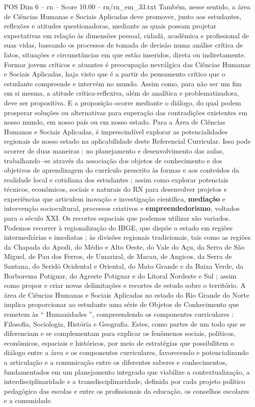 \begin{textsample}{POS Dim 6 – rn – Score 10.00 – rn/rn\_em\_33.txt}
Também, nesse sentido, a área de Ciências Humanas e Sociais Aplicadas deve promover, junto aos estudantes, reflexões e atitudes questionadoras, mediante as quais possam projetar expectativas em relação às dimensões pessoal, cidadã, acadêmica e profissional de suas vidas, baseando os processos de tomada de decisão numa análise crítica de fatos, situações e circunstâncias em que estão inseridos, direta ou indiretamente.
Formar jovens críticos e atuantes é preocupação nevrálgica das Ciências Humanas e Sociais Aplicadas, haja visto que é a partir do pensamento crítico que o estudante compreende e intervém no mundo.
Assim como, para não ser um fim em si mesma, a atitude crítica-reflexiva, além de analítica e problematizadora, deve ser propositiva.
E a proposição ocorre mediante o diálogo, do qual podem prosperar soluções ou alternativas para superação das contradições existentes em nosso mundo, em nosso país ou em nosso estado.
Para a Área de Ciências Humanas e Sociais Aplicadas, é imprescindível explorar as potencialidades regionais de nosso estado na aplicabilidade deste Referencial Curricular.
Isso pode ocorrer de duas maneiras : no planejamento e desenvolvimento das aulas, trabalhando -se através da associação dos objetos de conhecimento e dos objetivos de aprendizagem do currículo prescrito às formas e aos conteúdos da realidade local e cotidiana dos estudantes ; assim como explorar potenciais técnicos, econômicos, sociais e naturais do RN para desenvolver projetos e experiências que articulem inovação e investigação científica, \textbf{mediação} e intervenção sociocultural, processos criativos e \textbf{empreendedorismo}, voltados para o século XXI.
Os recortes espaciais que podemos utilizar são variados.
Podemos recorrer à regionalização do IBGE, que dispõe o estado em regiões intermediárias e imediatas ; às divisões regionais tradicionais, tais como as regiões da Chapada do Apodi, do Médio e Alto Oeste, do Vale do Açu, da Serra de São Miguel, de Pau dos Ferros, de Umarizal, de Macau, de Angicos, da Serra de Santana, do Seridó Ocidental e Oriental, do Mato Grande e da Baixa Verde, da Borborema Potiguar, do Agreste Potiguar e do Litoral Nordeste e Sul ; assim como propor e criar novas delimitações e recortes de estudo sobre o território.
A área de Ciências Humanas e Sociais Aplicadas no estado do Rio Grande do Norte implica proporcionar ao estudante uma série de Objetos de Conhecimento que remetem às “ Humanidades ”, compreendendo os componentes curriculares : Filosofia, Sociologia, História e Geografia.
Estes, como partes de um todo que se diferenciam e se complementam para explicar os fenômenos sociais, políticos, econômicos, espaciais e históricos, por meio de estratégias que possibilitem o diálogo entre a área e os componentes curriculares, favorecendo e potencializando a articulação e a comunicação entre os diferentes saberes e conhecimentos, fundamentados em um planejamento integrado que viabilize a contextualização, a interdisciplinaridade e a transdisciplinaridade, definida por cada projeto político pedagógico das escolas e entre os profissionais da educação, os conselhos escolares e a comunidade.

\end{textsample}
